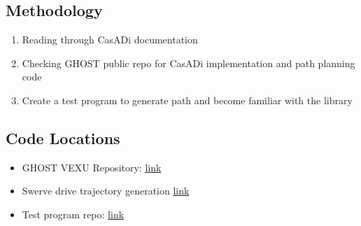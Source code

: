 \subsection*{Methodology}
\begin{enumerate}
    \item Reading through CasADi documentation
    \item Checking GHOST public repo for CasADi implementation and path planning code
    \item Create a test program to generate path and become familiar with the library
\end{enumerate}

\subsection*{Code Locations}
\begin{itemize}
    \item GHOST VEXU Repository: \href{https://github.com/VEXU-GHOST/VEXU_GHOST}{link}
    \item Swerve drive trajectory generation \href{https://github.com/VEXU-GHOST/VEXU_GHOST/blob/develop/11_Robots/ghost_swerve_mpc_planner/src/casadi_swerve_model_generation.cpp}{link}
    \item Test program repo: \href{https://github.com/satsinush/CasADi-Test.git}{link}
\end{itemize}


